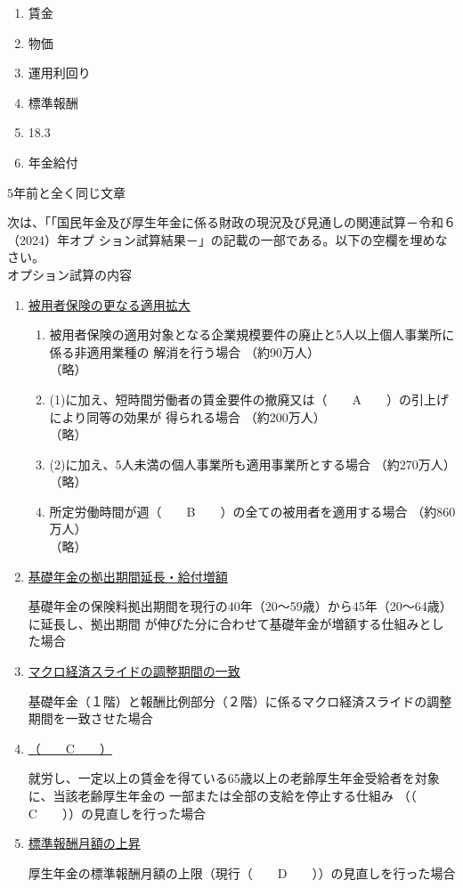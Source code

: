 \begin{answerbox}
  \begin{enumerate}[A: ]
    \item 賃金
    \item 物価
    \item 運用利回り
    \item 標準報酬
    \item 18.3
    \item 年金給付
  \end{enumerate}
\end{answerbox}



\begin{explanationbox}
  5年前と全く同じ文章
\end{explanationbox}

\begin{fillblank}[数理人試験 2025 問題3 設問1]
  次は、「「国民年金及び厚生年金に係る財政の現況及び見通しの関連試算－令和６（2024）年オプ
ション試算結果－」の記載の一部である。以下の空欄を埋めなさい。
\\

オプション試算の内容
\begin{enumerate}[1. ]
  \item \underline{被用者保険の更なる適用拡大}
  \begin{enumerate}[(1)]
    \item 被用者保険の適用対象となる企業規模要件の廃止と5人以上個人事業所に係る非適用業種の
解消を行う場合 （約90万人）\\
    （略）
    \item (1)に加え、短時間労働者の賃金要件の撤廃又は（　　A　　）の引上げにより同等の効果が
得られる場合 （約200万人）\\
    （略）
    \item (2)に加え、5人未満の個人事業所も適用事業所とする場合 （約270万人）\\
    （略）
    \item 所定労働時間が週（　　B　　）の全ての被用者を適用する場合 （約860万人）\\
    （略）
  \end{enumerate}
  \item \underline{基礎年金の拠出期間延長・給付増額}
  
  基礎年金の保険料拠出期間を現行の40年（20～59歳）から45年（20～64歳）に延長し、拠出期間
が伸びた分に合わせて基礎年金が増額する仕組みとした場合
  \item \underline{マクロ経済スライドの調整期間の一致}
  
  基礎年金（１階）と報酬比例部分（２階）に係るマクロ経済スライドの調整期間を一致させた場合
  \item \underline{（　　C　　）}
  
  就労し、一定以上の賃金を得ている65歳以上の老齢厚生年金受給者を対象に、当該老齢厚生年金の
一部または全部の支給を停止する仕組み （（　　C　　））の見直しを行った場合
  \item \underline{標準報酬月額の上昇}
  
  厚生年金の標準報酬月額の上限（現行（　　D　　））の見直しを行った場合
\end{enumerate}
\end{fillblank}

